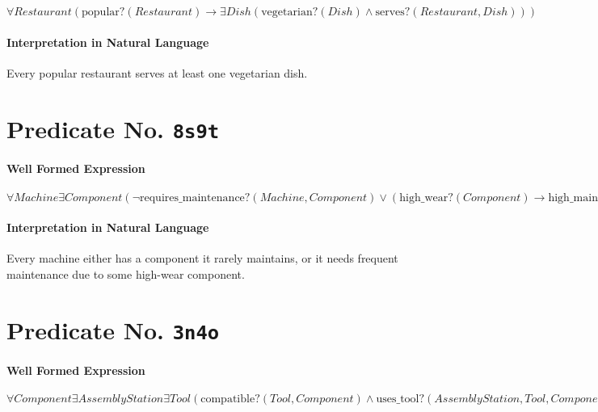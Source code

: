 \documentclass[11pt]{article}
\begin{document}
\(\forall \mathit{Restaurant} (\mathrm{popular?}(\mathit{Restaurant}) \rightarrow \exists \mathit{Dish} (\mathrm{vegetarian?}(\mathit{Dish}) \land \mathrm{serves?}(\mathit{Restaurant}, \mathit{Dish})))\)

\paragraph*{Interpretation in Natural Language}
\label{sec:orge97940b}

Every popular restaurant serves at least one vegetarian dish.



\section{Predicate No. \texttt{8s9t}}
\label{sec:orga76a2e4}

\paragraph*{Well Formed Expression}
\label{sec:orgd612996}

\(\forall \mathit{Machine} \exists \mathit{Component} (\neg \mathrm{requires\_maintenance?}(\mathit{Machine}, \mathit{Component}) \lor (\mathrm{high\_wear?}(\mathit{Component}) \rightarrow \mathrm{high\_maintenance\_frequency?}(\mathit{Machine})))\)

\paragraph*{Interpretation in Natural Language}
\label{sec:orgbec1841}

Every machine either has a component it rarely maintains, or it needs frequent maintenance due to some high-wear component.



\section{Predicate No. \texttt{3n4o}}
\label{sec:org74233ca}

\paragraph*{Well Formed Expression}
\label{sec:orgc5c5463}

\(\forall \mathit{Component} \exists \mathit{AssemblyStation} \exists \mathit{Tool} (\mathrm{compatible?}(\mathit{Tool}, \mathit{Component}) \land \mathrm{uses\_tool?}(\mathit{AssemblyStation}, \mathit{Tool}, \mathit{Component}))\)
\end{document}
